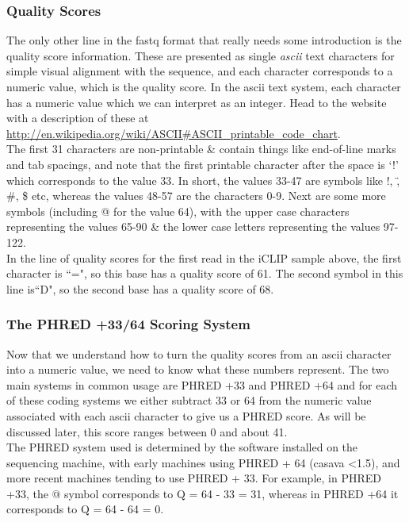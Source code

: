 \subsubsection{Quality Scores}
\begin{information}
The only other line in the fastq format that really needs some introduction is the quality score information.
These are presented as single \textit{ascii} text characters for simple visual alignment with the sequence, and each character corresponds to a numeric value, which is the quality score.
In the ascii text system, each character has a numeric value which we can interpret as an integer.
Head to the website with a description of these at \url{http://en.wikipedia.org/wiki/ASCII#ASCII\_printable\_code\_chart}.\\

The first 31 characters are non-printable \& contain things like end-of-line marks and tab spacings, and note that the first printable character after the space is `!' which corresponds to the value 33.
In short, the values 33-47 are symbols like !, \", \#, \$ etc, whereas the values 48-57 are the characters 0-9.
Next are some more symbols (including @ for the value 64), with the upper case characters representing the values 65-90 \& the lower case letters representing the values 97-122.\\

In the line of quality scores for the first read in the iCLIP sample above, the first character is ``=", so this base has a quality score of 61.
The second symbol in this line is``D", so the second base has a quality score of 68.
\end{information}

\subsubsection{The PHRED +33/64 Scoring System}
\begin{information}
Now that we understand how to turn the quality scores from an ascii character into a numeric value, we need to know what these numbers represent.
The two main systems in common usage are PHRED +33 and PHRED +64 and for each of these coding systems we either subtract 33 or 64 from the numeric value associated with each ascii character to give us a PHRED score.
As will be discussed later, this score ranges between 0 and about 41.\\

The PHRED system used is determined by the software installed on the sequencing machine, with early machines using PHRED + 64 (casava \textless 1.5), and more recent machines tending to use PHRED + 33.
For example, in PHRED +33, the @ symbol corresponds to Q = 64 - 33 = 31, whereas in PHRED +64 it corresponds to Q = 64 - 64 = 0. \\
\end{information}

